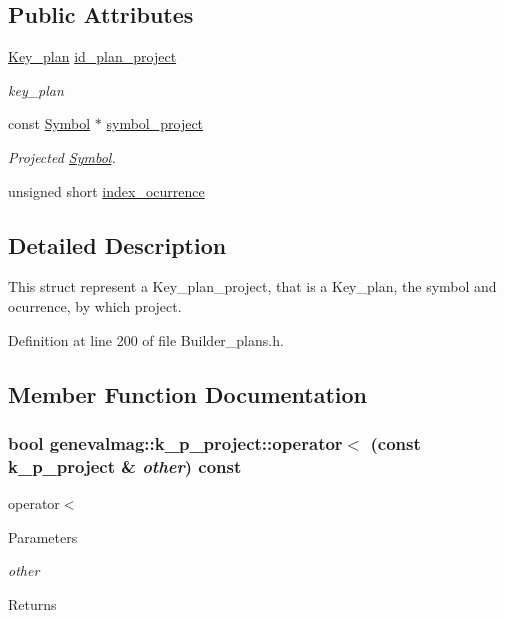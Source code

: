 \subsection*{Public Attributes}
\begin{DoxyCompactItemize}
\item 
\hyperlink{structgenevalmag_1_1k__plan}{Key\_\-plan} \hyperlink{structgenevalmag_1_1k__p__project_afc065645098439a308c5ca879e5e5a51}{id\_\-plan\_\-project}
\begin{DoxyCompactList}\small\item\em key\_\-plan \item\end{DoxyCompactList}\item 
const \hyperlink{classgenevalmag_1_1Symbol}{Symbol} $\ast$ \hyperlink{structgenevalmag_1_1k__p__project_a64f5efd91847bd333263c799360dd0b5}{symbol\_\-project}
\begin{DoxyCompactList}\small\item\em Projected \hyperlink{classgenevalmag_1_1Symbol}{Symbol}. \item\end{DoxyCompactList}\item 
unsigned short \hyperlink{structgenevalmag_1_1k__p__project_a42b98a1d22cb7215bdc7a0432f94cbcc}{index\_\-ocurrence}
\end{DoxyCompactItemize}


\subsection{Detailed Description}
This struct represent a Key\_\-plan\_\-project, that is a Key\_\-plan, the symbol and ocurrence, by which project. 

Definition at line 200 of file Builder\_\-plans.h.



\subsection{Member Function Documentation}
\hypertarget{structgenevalmag_1_1k__p__project_a4a06d269aa9b57fb5579757fad027c3f}{
\subsubsection[{operator$<$}]{\setlength{\rightskip}{0pt plus 5cm}bool genevalmag::k\_\-p\_\-project::operator$<$ (const {\bf k\_\-p\_\-project} \& {\em other}) const}}
\label{structgenevalmag_1_1k__p__project_a4a06d269aa9b57fb5579757fad027c3f}
operator$<$ 
\begin{DoxyParams}{Parameters}
\item[{\em other}]\end{DoxyParams}
\begin{DoxyReturn}{Returns}

\end{DoxyReturn}


